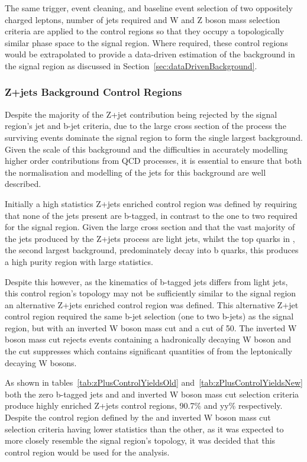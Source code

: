 The same trigger, event cleaning, and baseline event selection of two oppositely charged leptons, number of jets required and W and Z boson mass selection criteria are applied to the control regions so that they occupy a topologically similar phase space to the signal region.
Where required, these control regions would be extrapolated to provide a data-driven estimation of the background in the signal region as discussed in Section~\ref{sec:dataDrivenBackground}.

\subsubsection{Z+jets Background Control Regions}\label{subsec:zPlusJetsCR}
Despite the majority of the Z+jet contribution being rejected by the signal region's jet and b-jet criteria, due to the large cross section of the process the surviving events dominate the signal region to form the single largest background.
Given the scale of this background and the difficulties in accurately modelling higher order contributions from QCD processes, it is essential to ensure that both the normalisation and modelling of the jets for this background are well described.

Initially a high statistics Z+jets enriched control region was defined by requiring that none of the jets present are b-tagged, in contrast to the one to two required for the signal region.
Given the large cross section and that the vast majority of the jets produced by the Z+jets process are light jets, whilst the top quarks in \ttbar, the second largest background, predominately decay into b quarks, this produces a high purity region with large statistics.

Despite this however, as the kinematics of b-tagged jets differs from light jets, this control region's topology may not be sufficiently similar to the signal region an alternative Z+jets enriched control region was defined.
This alternative Z+jet control region required the same b-jet selection (one to two b-jets) as the signal region, but with an inverted W boson mass cut and a \MET cut of 50\GeV.
The inverted W boson mass cut rejects events containing a hadronically decaying W boson and the \MET cut suppresses \ttbar which contains significant quantities of \MET from the leptonically decaying W bosons.

As shown in tables~\ref{tab:zPlusControlYieldsOld} and~\ref{tab:zPlusControlYieldsNew} both the zero b-tagged jets and \MET and inverted W boson mass cut selection criteria produce highly enriched Z+jets control regions, 90.7\% and yy\% respectively.
Despite the control region defined by the \MET and inverted W boson mass cut selection criteria having lower statistics than the other, as it was expected to more closely resemble the signal region's topology, it was decided that this control region would be used for the analysis.

